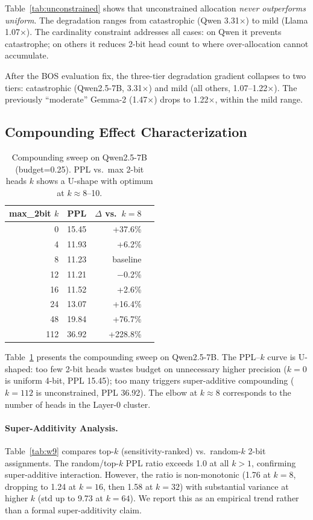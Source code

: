 \documentclass[11pt,a4paper]{article}
\begin{document}
Table~\ref{tab:unconstrained} shows that unconstrained allocation \emph{never outperforms uniform}. The degradation ranges from catastrophic (Qwen 3.31$\times$) to mild (Llama 1.07$\times$). The cardinality constraint addresses all cases: on Qwen it prevents catastrophe; on others it reduces 2-bit head count to where over-allocation cannot accumulate.

After the BOS evaluation fix, the three-tier degradation gradient collapses to two tiers: catastrophic (Qwen2.5-7B, 3.31$\times$) and mild (all others, 1.07--1.22$\times$). The previously ``moderate'' Gemma-2 (1.47$\times$) drops to 1.22$\times$, within the mild range.

\subsection{Compounding Effect Characterization}
\label{sec:compounding}

\begin{table}[t]
\centering
\small
\begin{tabular}{rrrr}
\toprule
\textbf{max\_2bit $k$} & \textbf{PPL} & \textbf{$\Delta$ vs.\ $k{=}8$} \\
\midrule
0  & 15.45 & +37.6\% \\
4  & 11.93 & +6.2\% \\
8  & 11.23 & baseline \\
12 & 11.21 & $-$0.2\% \\
16 & 11.52 & +2.6\% \\
24 & 13.07 & +16.4\% \\
48 & 19.84 & +76.7\% \\
112 & 36.92 & +228.8\% \\
\bottomrule
\end{tabular}
\caption{Compounding sweep on Qwen2.5-7B (budget=0.25). PPL vs.\ max 2-bit heads $k$ shows a U-shape with optimum at $k \approx 8$--10.}
\label{tab:compounding}
\end{table}

Table~\ref{tab:compounding} presents the compounding sweep on Qwen2.5-7B. The PPL--$k$ curve is U-shaped: too few 2-bit heads wastes budget on unnecessary higher precision ($k{=}0$ is uniform 4-bit, PPL 15.45); too many triggers super-additive compounding ($k{=}112$ is unconstrained, PPL 36.92). The elbow at $k \approx 8$ corresponds to the number of heads in the Layer-0 cluster.

\paragraph{Super-Additivity Analysis.}
Table~\ref{tab:w9} compares top-$k$ (sensitivity-ranked) vs.\ random-$k$ 2-bit assignments. The random/top-$k$ PPL ratio exceeds 1.0 at all $k > 1$, confirming super-additive interaction. However, the ratio is non-monotonic (1.76 at $k{=}8$, dropping to 1.24 at $k{=}16$, then 1.58 at $k{=}32$) with substantial variance at higher $k$ (std up to 9.73 at $k{=}64$). We report this as an empirical trend rather than a formal super-additivity claim.
\end{document}
